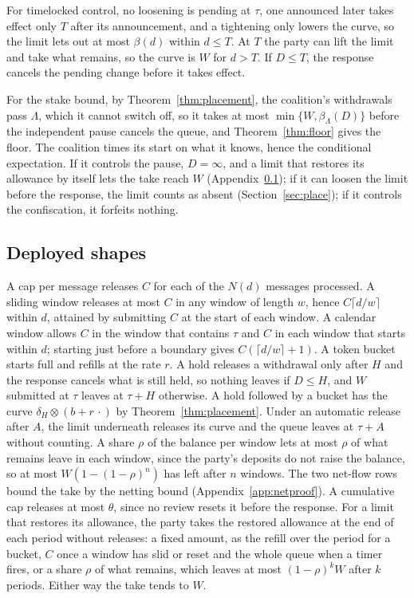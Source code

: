 \documentclass[conference,compsoc]{IEEEtran}
\numberwithin{equation}{section}
\theoremstyle{plain}
\theoremstyle{definition}
\theoremstyle{remark}
\begin{document}
For timelocked control, no loosening is pending at $\tau$, one announced later takes effect only $T$ after its announcement, and a tightening only lowers the curve, so the limit lets out at most $\beta(d)$ within $d \le T$. At $T$ the party can lift the limit and take what remains, so the curve is $W$ for $d > T$. If $D \le T$, the response cancels the pending change before it takes effect.

\label{app:stakeproof}For the stake bound, by Theorem~\ref{thm:placement}, the coalition's withdrawals pass $\Lambda$, which it cannot switch off, so it takes at most $\min\{W, \beta_\Lambda(D)\}$ before the independent pause cancels the queue, and Theorem~\ref{thm:floor} gives the floor. The coalition times its start on what it knows, hence the conditional expectation. If it controls the pause, $D = \infty$, and a limit that restores its allowance by itself lets the take reach $W$ (Appendix~\ref{app:shapeproof}); if it can loosen the limit before the response, the limit counts as absent (Section~\ref{sec:place}); if it controls the confiscation, it forfeits nothing.

\subsection{Deployed shapes}\label{app:shapeproof}

A cap per message releases $C$ for each of the $N(d)$ messages processed. A sliding window releases at most $C$ in any window of length $w$, hence $C \lceil d/w \rceil$ within $d$, attained by submitting $C$ at the start of each window. A calendar window allows $C$ in the window that contains $\tau$ and $C$ in each window that starts within $d$; starting just before a boundary gives $C(\lceil d/w \rceil + 1)$. A token bucket starts full and refills at the rate $r$. A hold releases a withdrawal only after $H$ and the response cancels what is still held, so nothing leaves if $D \le H$, and $W$ submitted at $\tau$ leaves at $\tau + H$ otherwise. A hold followed by a bucket has the curve $\delta_H \otimes (b + r\,\cdot)$ by Theorem~\ref{thm:placement}. Under an automatic release after $A$, the limit underneath releases its curve and the queue leaves at $\tau + A$ without counting. A share $\rho$ of the balance per window lets at most $\rho$ of what remains leave in each window, since the party's deposits do not raise the balance, so at most $W(1 - (1-\rho)^{n})$ has left after $n$ windows. The two net-flow rows bound the take by the netting bound (Appendix~\ref{app:netproof}). A cumulative cap releases at most $\theta$, since no review resets it before the response. For a limit that restores its allowance, the party takes the restored allowance at the end of each period without releases: a fixed amount, as the refill over the period for a bucket, $C$ once a window has slid or reset and the whole queue when a timer fires, or a share $\rho$ of what remains, which leaves at most $(1-\rho)^k W$ after $k$ periods. Either way the take tends to $W$.
\end{document}
